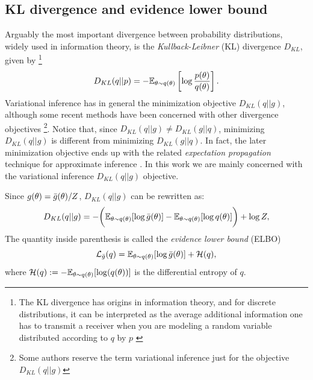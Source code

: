 \subsection{KL divergence and evidence lower bound}
Arguably the most important divergence between probability distributions, widely used in information theory, is the \textit{Kullback-Leibner} (KL) divergence $D_{KL}$, given by \footnote{The KL divergence has origins in information theory, and for discrete distributions, it can be interpreted as the average additional information one has to transmit a receiver when you are modeling a random variable distributed according to $q$ by $p$ \cite{Murphy_2012}}
\begin{equation}
D_{KL}(q||p) = -{\mathbb E}_{\theta \sim q(\theta)} \left[ \log \frac{p(\theta)}{q(\theta)} \right].
\end{equation}
Variational inference has in general the minimization objective $D_{KL}(q||g)$, although some recent methods have been concerned with other divergence objectives  \cite{Hernandes-Lobato_2015,Yingzhen_2016,Wang_2018} \footnote{Some authors reserve the term variational inference just for the objective $D_{KL}(q||g)$}. Notice that, since $D_{KL}(q||g) \neq D_{KL}(g||q)$, minimizing $D_{KL}(q||g)$ is different from minimizing $D_{KL}(g||q)$. In fact, the later minimization objective ends up with the related \textit{expectation propagation} technique for approximate inference \cite{Bishop_2007}. In this work we are mainly concerned with the variational inference $D_{KL}(q||g)$ objective.

Since $g(\theta) = {\bar{g}}(\theta)/Z$, $D_{KL}(q||g)$ can be rewritten as:
\begin{equation}
D_{KL}(q||g) = -\bigg({\mathbb E}_{\theta \sim q(\theta)}[\log {\bar{g}}(\theta)] -{\mathbb E}_{\theta \sim q(\theta)}[\log q(\theta)]\bigg) + \log Z,
\end{equation}
The quantity inside parenthesis is called the \textit{evidence lower bound} (ELBO)
\begin{equation}\label{elbodef}
\mathcal{L}_{\bar{g}}(q) = {\mathbb E}_{\theta \sim q(\theta)}[\log {\bar{g}}(\theta)] + \mathcal{H}(q),
\end{equation}
where $\mathcal{H}(q) := -{\mathbb E}_{\theta \sim q(\theta)}[\log(q(\theta))]$ is the differential entropy of $q$.

